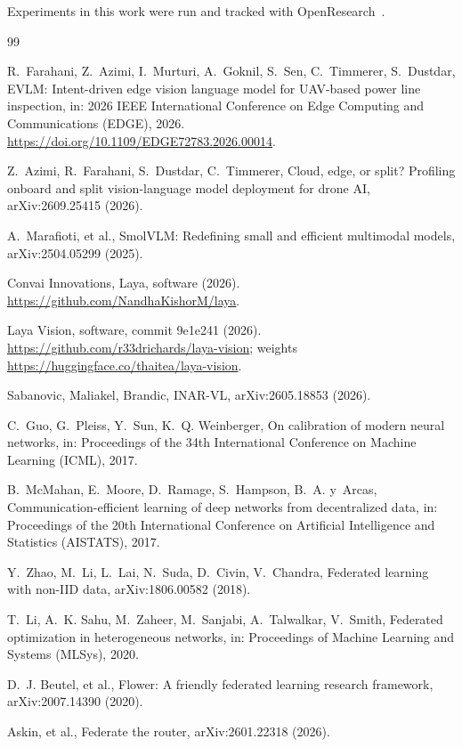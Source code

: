 \documentclass[preprint,12pt]{elsarticle}
\begin{document}
Experiments in this work were run and tracked with OpenResearch~\cite{openresearch}.

\begin{thebibliography}{99}

 R.~Farahani, Z.~Azimi, I.~Murturi, A.~Goknil, S.~Sen, C.~Timmerer, S.~Dustdar, EVLM: Intent-driven edge vision language model for UAV-based power line inspection, in: 2026 IEEE International Conference on Edge Computing and Communications (EDGE), 2026. \url{https://doi.org/10.1109/EDGE72783.2026.00014}.

 Z.~Azimi, R.~Farahani, S.~Dustdar, C.~Timmerer, Cloud, edge, or split? Profiling onboard and split vision-language model deployment for drone AI, arXiv:2609.25415 (2026).

 A.~Marafioti, et al., SmolVLM: Redefining small and efficient multimodal models, arXiv:2504.05299 (2025).

 Convai Innovations, Laya, software (2026). \url{https://github.com/NandhaKishorM/laya}.

 Laya Vision, software, commit 9e1e241 (2026). \url{https://github.com/r33drichards/laya-vision}; weights \url{https://huggingface.co/thaitea/laya-vision}.

 Sabanovic, Maliakel, Brandic, INAR-VL, arXiv:2605.18853 (2026).

 C.~Guo, G.~Pleiss, Y.~Sun, K.~Q. Weinberger, On calibration of modern neural networks, in: Proceedings of the 34th International Conference on Machine Learning (ICML), 2017.

 B.~McMahan, E.~Moore, D.~Ramage, S.~Hampson, B.~A. y~Arcas, Communication-efficient learning of deep networks from decentralized data, in: Proceedings of the 20th International Conference on Artificial Intelligence and Statistics (AISTATS), 2017.

 Y.~Zhao, M.~Li, L.~Lai, N.~Suda, D.~Civin, V.~Chandra, Federated learning with non-IID data, arXiv:1806.00582 (2018).

 T.~Li, A.~K. Sahu, M.~Zaheer, M.~Sanjabi, A.~Talwalkar, V.~Smith, Federated optimization in heterogeneous networks, in: Proceedings of Machine Learning and Systems (MLSys), 2020.

 D.~J. Beutel, et al., Flower: A friendly federated learning research framework, arXiv:2007.14390 (2020).

 Askin, et al., Federate the router, arXiv:2601.22318 (2026).


\end{thebibliography}
\end{document}
